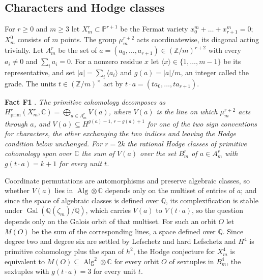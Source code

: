 \documentclass[10pt,twocolumn]{article}
\begin{document}
\hypertarget{characters-and-hodge-classes}{%
\subsection{Characters and Hodge
classes}\label{characters-and-hodge-classes}}

For \(r\ge0\) and \(m\ge3\) let \(X^r_m\subset\mathbb{P}^{r+1}\) be the
Fermat variety \(x_0^m+\dots+x_{r+1}^m=0\); \(X^0_m\) consists of \(m\)
points. The group \(\mu_m^{r+2}\) acts coordinatewise, its diagonal
acting trivially. Let \(A^r_m\) be the set of
\(a=(a_0,\dots,a_{r+1})\in(\mathbb{Z}/m)^{r+2}\) with every \(a_i\neq0\)
and \(\sum_i a_i=0\). For a nonzero residue \(x\) let
\(\langle x\rangle\in\{1,\dots,m-1\}\) be its representative, and set
\(|a|=\sum_i\langle a_i\rangle\) and \(g(a)=|a|/m\), an integer called
the grade. The units \(t\in(\mathbb{Z}/m)^\times\) act by
\(t\cdot a=(ta_0,\dots,ta_{r+1})\).

\textbf{Fact F1} \cite{shioda1979,sk1979}. \emph{The primitive
cohomology decomposes as
\(H^r_{\mathrm{prim}}(X^r_m,\mathbb{C})=\bigoplus_{a\in A^r_m}V(a)\),
where \(V(a)\) is the line on which \(\mu_m^{r+2}\) acts through \(a\),
and \(V(a)\subseteq H^{g(a)-1,\,r-g(a)+1}\) for one of the two sign
conventions for characters, the other exchanging the two indices and
leaving the Hodge condition below unchanged. For \(r=2k\) the rational
Hodge classes of primitive cohomology span over \(\mathbb{C}\) the sum
of \(V(a)\) over the set \(B^r_m\) of \(a\in A^r_m\) with
\(g(t\cdot a)=k+1\) for every unit \(t\).}

Coordinate permutations are automorphisms and preserve algebraic
classes, so whether \(V(a)\) lies in
\(\operatorname{Alg}\otimes\mathbb{C}\) depends only on the multiset of
entries of \(a\); and since the space of algebraic classes is defined
over \(\mathbb{Q}\), its complexification is stable under
\(\operatorname{Gal}(\mathbb{Q}(\zeta_m)/\mathbb{Q})\), which carries
\(V(a)\) to \(V(t\cdot a)\), so the question depends only on the Galois
orbit of that multiset. For such an orbit \(O\) let \(M(O)\) be the sum
of the corresponding lines, a space defined over \(\mathbb{Q}\). Since
degree two and degree six are settled by Lefschetz and hard Lefschetz
and \(H^4\) is primitive cohomology plus the span of \(h^2\), the Hodge
conjecture for \(X^4_m\) is equivalent to
\(M(O)\subseteq\operatorname{Alg}^2\otimes\mathbb{C}\) for every orbit
\(O\) of sextuples in \(B^4_m\), the sextuples with \(g(t\cdot a)=3\)
for every unit \(t\).
\end{document}
